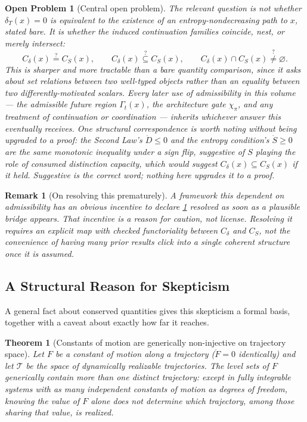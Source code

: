 \documentclass[12pt]{report}
\newtheorem{theorem}[definition]{Theorem}
\newtheorem{openproblem}[definition]{Open Problem}
\newtheorem{remark}[definition]{Remark}
\begin{document}
\begin{openproblem}[Central open problem]
\label{prob:admissibility-identity}
The relevant question is not whether $\delta_T(x) = 0$ is equivalent to
the existence of an entropy-nondecreasing path to $x$, stated bare. It
is whether the induced continuation families coincide, nest, or merely
intersect:
\[
C_\delta(x) \overset{?}{=} C_S(x), \qquad C_\delta(x) \overset{?}{\subseteq} C_S(x), \qquad C_\delta(x) \cap C_S(x) \overset{?}{\neq} \varnothing.
\]
This is sharper and more tractable than a bare quantity comparison,
since it asks about set relations between two well-typed objects rather
than an equality between two differently-motivated scalars. Every later
use of admissibility in this volume --- the admissible future region
$\Gamma_t(x)$, the architecture gate $\chi_\pi$, and any treatment of
continuation or coordination --- inherits whichever answer this
eventually receives. One structural correspondence is worth noting
without being upgraded to a proof: the Second Law's $\dot{D} \leq 0$ and
the entropy condition's $\dot{S} \geq 0$ are the same monotonic
inequality under a sign flip, suggestive of $S$ playing the role of
consumed distinction capacity, which would suggest $C_\delta(x) \subseteq
C_S(x)$ if it held. Suggestive is the correct word; nothing here
upgrades it to a proof.
\end{openproblem}

\begin{remark}[On resolving this prematurely]
\label{rem:no-rush}
A framework this dependent on admissibility has an obvious incentive to
declare \cref{prob:admissibility-identity} resolved as soon as a
plausible bridge appears. That incentive is a reason for caution, not
license. Resolving it requires an explicit map with checked
functoriality between $C_\delta$ and $C_S$, not the convenience of
having many prior results click into a single coherent structure once
it is assumed.
\end{remark}

\subsection{A Structural Reason for Skepticism}
\label{subsec:structural-skepticism}

A general fact about conserved quantities gives this skepticism a
formal basis, together with a caveat about exactly how far it reaches.

\begin{theorem}[Constants of motion are generically non-injective on trajectory space]
\label{claim:conservation-noninjective}
Let $F$ be a constant of motion along a trajectory ($\dot{F} = 0$
identically) and let $\mathcal{T}$ be the space of dynamically
realizable trajectories. The level sets of $F$ generically contain more
than one distinct trajectory: except in fully integrable systems with as
many independent constants of motion as degrees of freedom, knowing the
value of $F$ alone does not determine which trajectory, among those
sharing that value, is realized.
\end{theorem}
\end{document}
